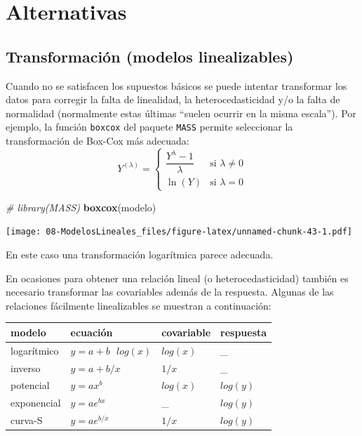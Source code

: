 \documentclass[]{book}
\newenvironment{Shaded}{\begin{snugshade}}{\end{snugshade}}
\newcommand{\KeywordTok}[1]{\textcolor[rgb]{0.13,0.29,0.53}{\textbf{#1}}}
\newcommand{\CommentTok}[1]{\textcolor[rgb]{0.56,0.35,0.01}{\textit{#1}}}
\newcommand{\NormalTok}[1]{#1}
\begin{document}
\section{Alternativas}\label{alternativas}

\subsection{Transformación (modelos
linealizables)}\label{transformacion-modelos-linealizables}

Cuando no se satisfacen los supuestos básicos se puede intentar
transformar los datos para corregir la falta de linealidad, la
heterocedasticidad y/o la falta de normalidad (normalmente estas últimas
``suelen ocurrir en la misma escala''). Por ejemplo, la función
\texttt{boxcox} del paquete \texttt{MASS} permite seleccionar la
transformación de Box-Cox más adecuada: \[Y^{(\lambda)} =
\begin{cases}
\dfrac{Y^\lambda - 1}{\lambda} & \text{si } \lambda \neq 0 \\
\ln{(Y)} & \text{si } \lambda = 0
\end{cases}\]

\begin{Shaded}
\begin{Highlighting}[]
\CommentTok{# library(MASS)}
\KeywordTok{boxcox}\NormalTok{(modelo)}
\end{Highlighting}
\end{Shaded}

\texttt{[image: 08-ModelosLineales\_files/figure-latex/unnamed-chunk-43-1.pdf]}

En este caso una transformación logarítmica parece adecuada.

En ocasiones para obtener una relación lineal (o heterocedasticidad)
también es necesario transformar las covariables además de la respuesta.
Algunas de las relaciones fácilmente linealizables se muestran a
continuación:

\begin{longtable}[]{@{}llll@{}}
\toprule
modelo & ecuación & covariable & respuesta\tabularnewline
\midrule
\endhead
logarítmico & \(y = a + b\text{ }log(x)\) & \(log(x)\) &
\_\tabularnewline
inverso & \(y = a + b/x\) & \(1/x\) & \_\tabularnewline
potencial & \(y = ax^b\) & \(log(x)\) & \(log(y)\)\tabularnewline
exponencial & \(y = ae^{bx}\) & \_ & \(log(y)\)\tabularnewline
curva-S & \(y = ae^{b/x}\) & \(1/x\) & \(log(y)\)\tabularnewline
\bottomrule
\end{longtable}
\end{document}
